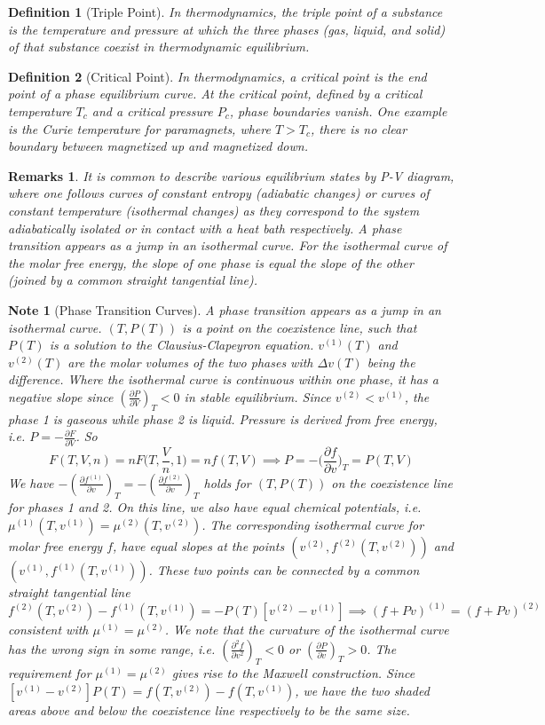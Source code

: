 \documentclass[a4paper]{article}
\newtheorem{remarks}{Remarks}[section]
\newtheorem{Note}{Note}[section]
\theoremstyle{new}
\newtheorem{defi}{Definition}[section]
\begin{document}
\begin{defi}[Triple Point]
In thermodynamics, the triple point of a substance is the temperature and pressure at which the three phases (gas, liquid, and solid) of that substance coexist in thermodynamic equilibrium.
\end{defi}
\begin{defi}[Critical Point]
In thermodynamics, a critical point is the end point of a phase equilibrium curve. At the critical point, defined by a critical temperature $T_c$ and a critical pressure $P_c$, phase boundaries vanish. One example is the Curie temperature for paramagnets, where $T>T_c$, there is no clear boundary between magnetized up and magnetized down.
\end{defi}
\begin{remarks}
It is common to describe various equilibrium states by P-V diagram, where one follows curves of constant entropy (adiabatic changes) or curves of constant temperature (isothermal changes) as they correspond to the system adiabatically isolated or in contact with a heat bath respectively. A phase transition appears as a jump in an isothermal curve. For the isothermal curve of the molar free energy, the slope of one phase is equal the slope of the other (joined by a common straight tangential line).
\end{remarks}
\begin{Note}[Phase Transition Curves]
A phase transition appears as a jump in an isothermal curve. $(T,P(T))$ is a point on the coexistence line, such that $P(T)$ is a solution to the Clausius-Clapeyron equation. $v^{(1)}(T)$ and $v^{(2)}(T)$ are the molar volumes of the two phases with $\Delta v(T)$ being the difference. Where the isothermal curve is continuous within one phase, it has a negative slope since $(\frac{\partial P}{\partial V})_T<0$ in stable equilibrium. Since $v^{(2)}<v^{(1)}$, the phase 1 is gaseous while phase 2 is liquid. Pressure is derived from free energy, i.e. $P=-\frac{\partial F}{\partial V}$. So
$$F(T,V,n)=nF\bigg(T,\frac{V}{n},1\bigg)=nf(T,V)\implies P=-\bigg(\frac{\partial f}{\partial v}\bigg)_T=P(T,V)$$
We have $-(\frac{\partial f^{(1)}}{\partial v})_T=-(\frac{\partial f^{(2)}}{\partial v})_T$ holds for $(T,P(T))$ on the coexistence line for phases 1 and 2. On this line, we also have equal chemical potentials, i.e. $\mu^{(1)}(T,v^{(1)})=\mu^{(2)}(T,v^{(2)})$.  The corresponding isothermal curve for molar free energy $f$, have equal slopes at the points $(v^{(2)},f^{(2)}(T,v^{(2)}))$ and $(v^{(1)},f^{(1)}(T,v^{(1)}))$. These two points can be connected by a common straight tangential line
$$f^{(2)}(T,v^{(2)})-f^{(1)}(T,v^{(1)})=-P(T)[v^{(2)}-v^{(1)}]\implies (f+Pv)^{(1)}=(f+Pv)^{(2)}$$
consistent with $\mu^{(1)}=\mu^{(2)}$. We note that the curvature of the isothermal curve has the wrong sign in some range, i.e. $(\frac{\partial^2f}{\partial v^2})_T<0$ or $(\frac{\partial P}{\partial v})_T>0$. The requirement for $\mu^{(1)}=\mu^{(2)}$ gives rise to the Maxwell construction. Since $[v^{(1)}-v^{(2)}]P(T)=f(T,v^{(2)})-f(T,v^{(1)})$, we have the two shaded areas above and below the coexistence line respectively to be the same size.
\end{Note}
\end{document}
